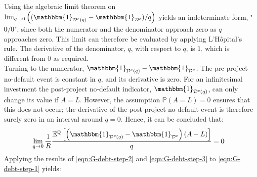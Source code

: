 \documentclass[../main.tex]{subfiles}
\begin{document}
        Using the algebraic limit theorem on 
        $\lim_{q\rightarrow0}
        \left(
            (\mathbbm{1}_{\mathcal{D}^{c}(q)} 
            - \mathbbm{1}_{\mathcal{D}^{c}})
        / q
        \right) 
        $
        yields an indeterminate form, "$0/0$", since both the numerator and the denominator 
        approach zero as $q$ approaches zero.
        This limit can therefore be evaluated by applying 
        L'H\^{o}pital's  %
        rule.
        The derivative of the denominator, $q$, with respect to $q$, is $1$,
        which is different from $0$ as required. 
        \\
        Turning to the numerator, $\mathbbm{1}_{\mathcal{D}^{c}(q)} - \mathbbm{1}_{\mathcal{D}^{c}}$.
        The pre-project no-default event is constant in $q$, and its derivative is zero. 
        For an infinitesimal investment the post-project no-default indicator, 
        $\mathbbm{1}_{\mathcal{D}^{c}(q)}$, can only change its value if $A = L$. 
        However, the assumption $\mathbb{P}\left(A = L\right) = 0$ ensures that this does not occur;
        the derivative of the post-project no-default event
        is therefore surely zero in an interval around $q=0$.
        Hence, it can be concluded that:
        \begin{equation}
            \lim_{q\rightarrow0} 
            \discountfactor
            \frac{
            \mathbb{E}^{\mathbb{Q}}\left[
                \left(
                    \mathbbm{1}_{\mathcal{D}^{c}(q)} 
                    - \mathbbm{1}_{\mathcal{D}^{c}}
                \right)
                \left(
                    A - L
                \right)
            \right] 
            }{
                q
            }
            = 0
            \label{eqn:G-debt-step-3}
        \end{equation}
        Applying the results of \cref{eqn:G-debt-step-2} and \cref{eqn:G-debt-step-3}
        to \cref{eqn:G-debt-step-1} yields:
\end{document}

